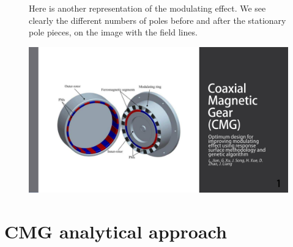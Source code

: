 \begin{figure}[H]
    \begin{minipage}{.45\linewidth}
        
       Here is another representation of the modulating effect. We see clearly the different numbers of poles before and after the stationary pole pieces, on the image with the field lines. 



    \end{minipage}
    \hfill%
    \begin{minipage}[c]{.45\linewidth}
        \centering
        \includegraphics[page={12},width=\textwidth]{LELEC2311.allow.pdf}
    \end{minipage}
\end{figure}

\section{CMG analytical approach}

